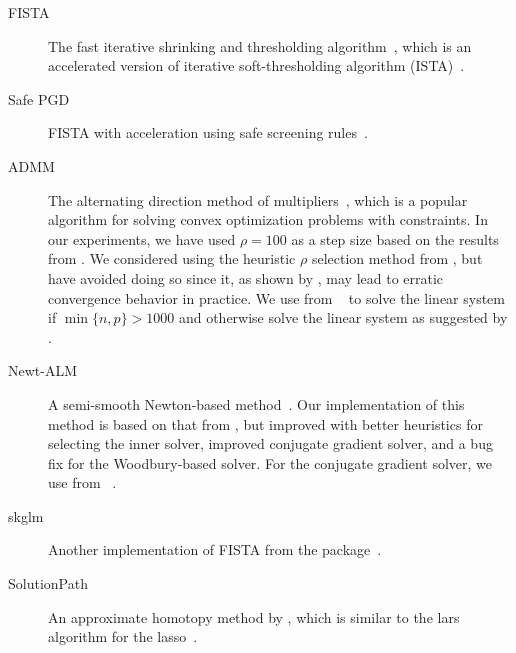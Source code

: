 \documentclass[article]{jss}
\begin{document}
\begin{appendix}
\begin{description}
    \item[FISTA] The fast iterative shrinking and thresholding
          algorithm~\citep{beck2009}, which is an accelerated version of iterative
          soft-thresholding algorithm (ISTA)~\citep{wright2009}.

    \item[Safe PGD] FISTA with acceleration using safe screening
          rules~\citep{elvira2023}.

    \item[ADMM] The alternating direction method of
          multipliers~\citep{glowinski1975,boyd2010}, which is a popular algorithm
          for solving convex optimization problems with constraints. In our experiments,
          we have used \(\rho = 100\) as a step size based on the
          results from \citet{larsson2023}.
          We considered using the heuristic \(\rho\) selection method from
          \citet{boyd2010}, but have avoided doing so since it, as shown by \citet{larsson2023},
          may lead to erratic convergence behavior in practice. We use 
          from ~\citep{virtanen2020} to solve the linear system if
          \(\min\{n, p\} > \num{1000}\) and otherwise solve the linear system
          as suggested by \citet{boyd2010}.

    \item[Newt-ALM] A semi-smooth Newton-based method~\citep{luo2019}. Our
          implementation of this method is based on that from \citet{larsson2023},
          but improved with better heuristics for selecting the inner solver,
          improved conjugate gradient solver, and
          a bug fix for the Woodbury-based solver. For the conjugate gradient solver,
          we use  from ~\citep{virtanen2020}.

    \item[skglm] Another implementation of FISTA from the
           package~\citep{bertrand2022}.

    \item[SolutionPath] An approximate homotopy method by \citet{dupuis2024},
          which is similar to the lars algorithm for the lasso~\citep{efron2004}.
  \end{description}

\end{appendix}
\end{document}
